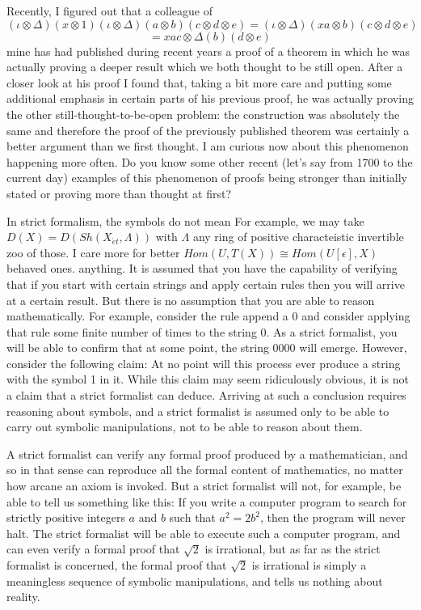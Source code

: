 \documentclass[12pt,letterpaper]{book}
\begin{document}
Recently, I figured out that a colleague of $$(\iota \otimes \Delta)(x \otimes 1) (\iota \otimes \Delta)(a \otimes b)(c \otimes d \otimes e) = (\iota \otimes \Delta)(xa \otimes b)(c\otimes d \otimes e)$$
$$= xac \otimes \Delta(b)(d \otimes e)$$  mine has had published during recent years a proof of a theorem in which he was actually proving a deeper result which we both thought to be still open. After a closer look at his proof I found that, taking a bit more care and putting some additional emphasis in certain parts of his previous proof, he was actually proving the other still-thought-to-be-open problem: the construction was absolutely the same and therefore the proof of the previously published theorem was certainly a better argument than we first thought. I am curious now about this phenomenon happening more often. Do you know some other recent (let's say from 1700 to the current day) examples of this phenomenon of proofs being stronger than initially stated or proving more than thought at first?

In strict formalism, the symbols do not mean  For example, we may take $D(X)=D(Sh(X_{\acute{e}t},\Lambda))$ with $\Lambda$ any ring of positive characteistic invertible 
zoo of those. I care more for better $Hom(U,T(X)) \cong Hom(U[\epsilon],X)$ behaved ones. anything.  It is assumed that you have the capability of verifying that if you start with certain strings and apply certain rules then you will arrive at a certain result.  But there is no assumption that you are able to reason mathematically. For example, consider the rule append a 0 and consider applying that rule some finite number of times to the string 0. As a strict formalist, you will be able to confirm that at some point, the string 0000 will emerge.  However, consider the following claim: At no point will this process ever produce a string with the symbol 1 in it.  While this claim may seem ridiculously obvious, it is not a claim that a strict formalist can deduce.  Arriving at such a conclusion requires reasoning about symbols, and a strict formalist is assumed only to be able to carry out symbolic manipulations, not to be able to reason about them.

A strict formalist can verify any formal proof produced by a mathematician, and so in that sense can reproduce all the formal content of mathematics, no matter how arcane an axiom is invoked.  But a strict formalist will not, for example, be able to tell us something like this: If you write a computer program to search for strictly positive integers $a$ and $b$ such that $a^2 = 2b^2$, then the program will never halt.  The strict formalist will be able to execute such a computer program, and can even verify a formal proof that $\sqrt{2}$ is irrational, but as far as the strict formalist is concerned, the formal proof that $\sqrt{2}$ is irrational is simply a meaningless sequence of symbolic manipulations, and tells us nothing about reality.
\end{document}
